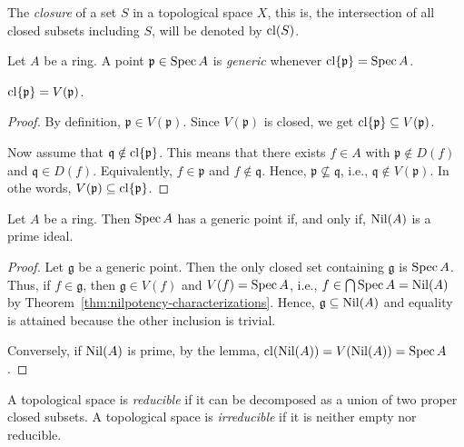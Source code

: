 \begin{ntn}
    The \textsl{closure} of a set\/ $S$ in a topological space\/ $X$, this is, the intersection of all closed subsets including $S$, will be denoted by\/ $\operatorname{cl}(S)$.
\end{ntn}

\begin{defn}
    Let $A$ be a ring. A point $\mathfrak p\in\operatorname{Spec} A$ is \textsl{generic} whenever $\operatorname{cl}\{\mathfrak p\}=\operatorname{Spec} A$.
\end{defn}

\begin{lem}
    $\operatorname{cl}\{\mathfrak p\}=V(\mathfrak p)$.
\end{lem}

\begin{proof}
    By definition, $\mathfrak p\in V(\mathfrak p)$. Since $V(\mathfrak p)$ is closed, we get $\operatorname{cl}\{\mathfrak p\}\subseteq V(\mathfrak p)$.

    Now assume that $\mathfrak q\notin\operatorname{cl}\{\mathfrak p\}$. This means that there exists $f\in A$ with $\mathfrak p\notin D(f)$ and $\mathfrak q\in D(f)$. Equivalently, $f\in\mathfrak p$ and $f\notin\mathfrak q$. Hence, $\mathfrak p\not\subseteq\mathfrak q$, i.e., $\mathfrak q\notin V(\mathfrak p)$. In othe words, $V(\mathfrak p)\subseteq\operatorname{cl}\{\mathfrak p\}$.
\end{proof}

\begin{prop}\label{prop:generic-point}
    Let\/ $A$ be a ring. Then\/ $\operatorname{Spec} A$ has a generic point if, and only if, $\operatorname{Nil}(A)$ is a prime ideal.
\end{prop}

\begin{proof}
    Let $\mathfrak g$ be a generic point. Then the only closed set containing $\mathfrak g$ is $\operatorname{Spec} A$. Thus, if $f\in\mathfrak g$, then $\mathfrak g\in V(f)$ and $V(f)=\operatorname{Spec} A$, i.e., $f\in\bigcap\operatorname{Spec} A=\operatorname{Nil}(A)$ by Theorem~\ref{thm:nilpotency-characterizations}. Hence, $\mathfrak g\subseteq\operatorname{Nil}(A)$ and equality is attained because the other inclusion is trivial.

    Conversely, if $\operatorname{Nil}(A)$ is prime, by the lemma, $\operatorname{cl}(\operatorname{Nil}(A))=V(\operatorname{Nil}(A))=\operatorname{Spec} A$.
\end{proof}

\begin{defn}
    A topological space is \textsl{reducible} if it can be decomposed as a union of two proper closed subsets. A topological space is \textsl{irreducible} if it is neither empty nor reducible.
\end{defn}

